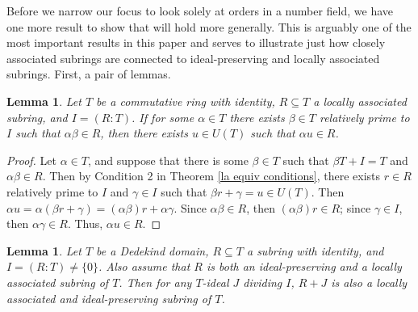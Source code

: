 \documentclass[12pt]{amsart}
\newtheorem{lemma}[theorem]{Lemma}
\theoremstyle{definition}
\begin{document}
	Before we narrow our focus to look solely at orders in a number field, we have one more result to show that will hold more generally. This is arguably one of the most important results in this paper and serves to illustrate just how closely associated subrings are connected to ideal-preserving and locally associated subrings. First, a pair of lemmas.
	
	\begin{lemma}
		\label{Lemma 1}
		Let $T$ be a commutative ring with identity, $R\subseteq T$ a locally associated subring, and $I=(R:T)$. If for some $\alpha \in T$ there exists $\beta\in T$ relatively prime to $I$ such that $\alpha\beta\in R$, then there exists $u\in U(T)$ such that $\alpha u\in R$.
	\end{lemma}
	
	\begin{proof}
		Let $\alpha\in T$, and suppose that there is some $\beta\in T$ such that $\beta T+I=T$ and $\alpha\beta\in R$. Then by Condition 2 in Theorem \ref{la equiv conditions}, there exists $r\in R$ relatively prime to $I$ and $\gamma\in I$ such that $\beta r+\gamma=u\in U(T)$. Then $\alpha u=\alpha(\beta r+\gamma)=(\alpha\beta)r+\alpha\gamma$. Since $\alpha\beta\in R$, then $(\alpha\beta)r\in R$; since $\gamma\in I$, then $\alpha\gamma\in R$. Thus, $\alpha u\in R$.
	\end{proof}
	
	\begin{lemma}
		\label{Lemma 2}
		Let $T$ be a Dedekind domain, $R\subseteq T$ a subring with identity, and $I=(R:T)\neq \{0\}$. Also assume that $R$ is both an ideal-preserving and a locally associated subring of $T$. Then for any $T$-ideal $J$ dividing $I$, $R+J$ is also a locally associated and ideal-preserving subring of $T$.
	\end{lemma}
	
\end{document}
